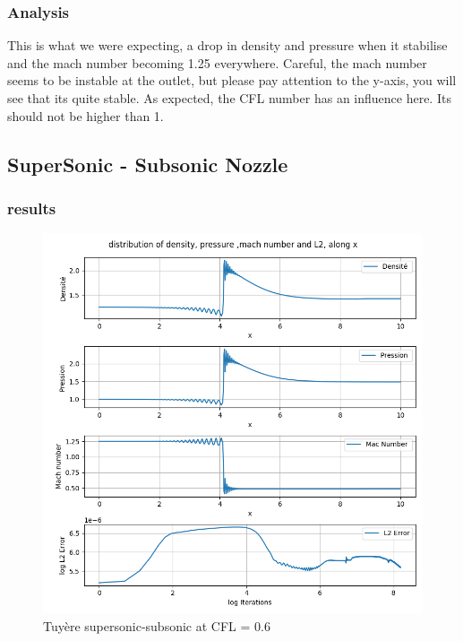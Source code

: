 \documentclass[12pt]{article}
\begin{document}
\subsubsection{Analysis}
This is what we were expecting, a drop in density and pressure when it stabilise and the mach number becoming 1.25 everywhere. 
Careful, the mach number seems to be instable at the outlet, but please pay attention to the y-axis, you will see that its quite stable. 
As expected, the CFL number has an influence here. Its should not be higher than 1. 


\subsection{SuperSonic - Subsonic Nozzle}
\subsubsection{results}
\begin{figure}[H] %
    \centering
    \includegraphics[width=\textwidth,height=\textheight,keepaspectratio]{PLOTS/Tuyere_super_sub_Macormack_CFL06.png}
    \caption{Tuyère supersonic-subsonic at CFL = 0.6}
    \label{fig:your_label}
\end{figure}
\end{document}
